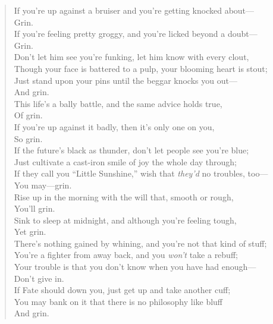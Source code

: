 

\begin{verse}
If you're up against a bruiser and you're getting knocked about---\\
\hspace*{18em}Grin.\\
If you're feeling pretty groggy, and you're licked beyond a doubt---\\
\hspace*{18em}Grin.\\[1.5\baselineskip]

Don't let him see you're funking, let him know with every clout,\\
Though your face is battered to a pulp, your blooming heart is stout;\\
Just stand upon your pins until the beggar knocks you out---\\
\hspace*{18em}And grin.\\[1.5\baselineskip]

This life's a bally battle, and the same advice holds true,\\
\hspace*{18em}Of grin.\\
If you're up against it badly, then it's only one on you,\\
\hspace*{18em}So grin.\\[1.5\baselineskip]

If the future's black as thunder, don't let people see you're blue;\\
Just cultivate a cast-iron smile of joy the whole day through;\\
If they call you ``Little Sunshine,'' wish that \textit{they'd} no troubles, too---\\
\hspace*{18em}You may---grin.\\[1.5\baselineskip]

Rise up in the morning with the will that, smooth or rough,\\
\hspace*{18em}You'll grin.\\
Sink to sleep at midnight, and although you're feeling tough,\\
\hspace*{18em}Yet grin.\\[1.5\baselineskip]

There's nothing gained by whining, and you're not that kind of stuff;\\
You're a fighter from away back, and you \textit{won't} take a rebuff;\\
Your trouble is that you don't know when you have had enough---\\
\hspace*{18em}Don't give in.\\[1.5\baselineskip]

If Fate should down you, just get up and take another cuff;\\
You may bank on it that there is no philosophy like bluff\\
\hspace*{18em}And grin.\\
\end{verse}